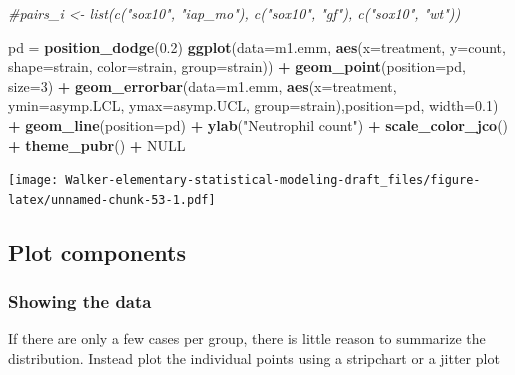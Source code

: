 \documentclass[]{book}
\newenvironment{Shaded}{\begin{snugshade}}{\end{snugshade}}
\newcommand{\CommentTok}[1]{\textcolor[rgb]{0.56,0.35,0.01}{\textit{#1}}}
\newcommand{\DataTypeTok}[1]{\textcolor[rgb]{0.13,0.29,0.53}{#1}}
\newcommand{\DecValTok}[1]{\textcolor[rgb]{0.00,0.00,0.81}{#1}}
\newcommand{\FloatTok}[1]{\textcolor[rgb]{0.00,0.00,0.81}{#1}}
\newcommand{\KeywordTok}[1]{\textcolor[rgb]{0.13,0.29,0.53}{\textbf{#1}}}
\newcommand{\NormalTok}[1]{#1}
\newcommand{\OperatorTok}[1]{\textcolor[rgb]{0.81,0.36,0.00}{\textbf{#1}}}
\newcommand{\OtherTok}[1]{\textcolor[rgb]{0.56,0.35,0.01}{#1}}
\newcommand{\StringTok}[1]{\textcolor[rgb]{0.31,0.60,0.02}{#1}}
\begin{document}
\begin{Shaded}
\begin{Highlighting}[]
\CommentTok{#pairs_i <- list(c("sox10", "iap_mo"), c("sox10", "gf"), c("sox10", "wt"))}

\NormalTok{pd =}\StringTok{ }\KeywordTok{position_dodge}\NormalTok{(}\FloatTok{0.2}\NormalTok{)}
\KeywordTok{ggplot}\NormalTok{(}\DataTypeTok{data=}\NormalTok{m1.emm, }\KeywordTok{aes}\NormalTok{(}\DataTypeTok{x=}\NormalTok{treatment, }\DataTypeTok{y=}\NormalTok{count, }\DataTypeTok{shape=}\NormalTok{strain, }\DataTypeTok{color=}\NormalTok{strain, }\DataTypeTok{group=}\NormalTok{strain)) }\OperatorTok{+}
\StringTok{  }\KeywordTok{geom_point}\NormalTok{(}\DataTypeTok{position=}\NormalTok{pd, }\DataTypeTok{size=}\DecValTok{3}\NormalTok{) }\OperatorTok{+}
\StringTok{  }\KeywordTok{geom_errorbar}\NormalTok{(}\DataTypeTok{data=}\NormalTok{m1.emm, }\KeywordTok{aes}\NormalTok{(}\DataTypeTok{x=}\NormalTok{treatment, }\DataTypeTok{ymin=}\NormalTok{asymp.LCL, }\DataTypeTok{ymax=}\NormalTok{asymp.UCL, }\DataTypeTok{group=}\NormalTok{strain),}\DataTypeTok{position=}\NormalTok{pd, }\DataTypeTok{width=}\FloatTok{0.1}\NormalTok{) }\OperatorTok{+}
\StringTok{  }\KeywordTok{geom_line}\NormalTok{(}\DataTypeTok{position=}\NormalTok{pd) }\OperatorTok{+}
\StringTok{  }\KeywordTok{ylab}\NormalTok{(}\StringTok{"Neutrophil count"}\NormalTok{) }\OperatorTok{+}
\StringTok{  }\KeywordTok{scale_color_jco}\NormalTok{() }\OperatorTok{+}
\StringTok{  }\KeywordTok{theme_pubr}\NormalTok{() }\OperatorTok{+}
\StringTok{  }\OtherTok{NULL}
\end{Highlighting}
\end{Shaded}

\texttt{[image: Walker-elementary-statistical-modeling-draft\_files/figure-latex/unnamed-chunk-53-1.pdf]}

\hypertarget{plot-components}{%
\subsection{Plot components}\label{plot-components}}

\hypertarget{showing-the-data}{%
\subsubsection{Showing the data}\label{showing-the-data}}

If there are only a few cases per group, there is little reason to summarize the distribution. Instead plot the individual points using a stripchart or a jitter plot
\end{document}
